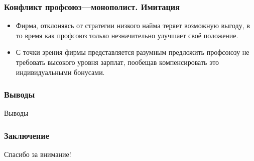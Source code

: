 \documentclass {beamer}
\begin{document}
\begin{frame}
\frametitle{Конфликт профсоюз---монополист. Имитация}
\begin{itemize}
	\item	Фирма, отклоняясь от стратегии низкого найма теряет возможную выгоду, 
		в то время как профсоюз только незначительно улучшает своё положение. 

	\item 	С точки зрения фирмы представляется разумным предложить профсоюзу не требовать 
		высокого уровня зарплат, пообещав компенсировать это индивидуальными бонусами.
\end{itemize}
\end{frame}


\begin{frame}
\frametitle{Выводы}
Выводы\\
\end{frame}

\begin{frame}
\frametitle{Заключение}
Спасибо за внимание!\\
\end{frame}
\end{document}
